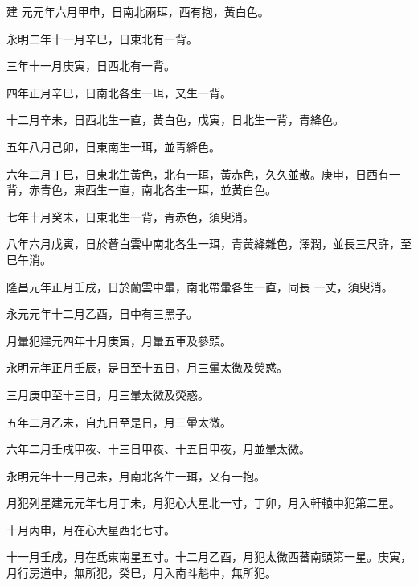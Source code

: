 \begin{pinyinscope}
 建
 元元年六月甲申，日南北兩珥，西有抱，黃白色。



 永明二年十一月辛巳，日東北有一背。



 三年十一月庚寅，日西北有一背。



 四年正月辛巳，日南北各生一珥，又生一背。



 十二月辛未，日西北生一直，黃白色，戊寅，日北生一背，青絳色。



 五年八月己卯，日東南生一珥，並青絳色。



 六年二月丁巳，日東北生黃色，北有一珥，黃赤色，久久並散。庚申，日西有一背，赤青色，東西生一直，南北各生一珥，並黃白色。



 七年十月癸未，日東北生一背，青赤色，須臾消。



 八年六月戊寅，日於蒼白雲中南北各生一珥，青黃絳雜色，澤潤，並長三尺許，至巳午消。



 隆昌元年正月壬戌，日於蘭雲中暈，南北帶暈各生一直，同長
 一丈，須臾消。



 永元元年十二月乙酉，日中有三黑子。



 月暈犯建元四年十月庚寅，月暈五車及參頭。



 永明元年正月壬辰，是日至十五日，月三暈太微及熒惑。



 三月庚申至十三日，月三暈太微及熒惑。



 五年二月乙未，自九日至是日，月三暈太微。



 六年二月壬戌甲夜、十三日甲夜、十五日甲夜，月並暈太微。



 永明元年十一月己未，月南北各生一珥，又有一抱。



 月犯列星建元元年七月丁未，月犯心大星北一寸，丁卯，月入軒轅中犯第二星。



 十月丙申，月在心大星西北七寸。



 十一月壬戌，月在氐東南星五寸。十二月乙酉，月犯太微西蕃南頭第一星。庚寅，月行房道中，無所犯，癸巳，月入南斗魁中，無所犯。




\end{pinyinscope}
